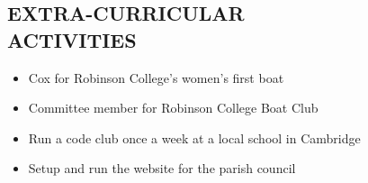 \documentclass[margin,12pt]{res}
\begin{document}
\begin{resume}
\section{EXTRA-CURRICULAR \\ ACTIVITIES}   
  \begin{itemize}          
    \item Cox for Robinson College's women's first boat
    \item Committee member for Robinson College Boat Club
    \item Run a code club once a week at a local school in Cambridge 
    \item Setup and run the website for the parish council 
  \end{itemize}
 

\end{resume}
\end{document}
